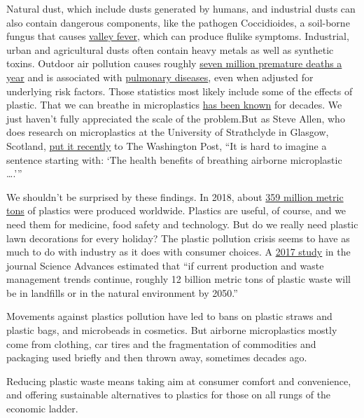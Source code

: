 Natural dust, which include dusts generated by humans, and industrial
dusts can also contain dangerous components, like the pathogen
Coccidioides, a soil-borne fungus that causes
\href{https://www.mayoclinic.org/diseases-conditions/valley-fever/symptoms-causes/syc-20378761}{valley
fever}, which can produce flulike symptoms. Industrial, urban and
agricultural dusts often contain heavy metals as well as synthetic
toxins. Outdoor air pollution causes roughly
\href{https://www.who.int/mediacentre/news/releases/2014/air-pollution/en/}{seven
million premature deaths a year} and is associated with
\href{https://www.nejm.org/doi/full/10.1056/NEJM199312093292401}{pulmonary
diseases}, even when adjusted for underlying risk factors. Those
statistics most likely include some of the effects of plastic. That we
can breathe in microplastics
\href{https://cebp.aacrjournals.org/content/cebp/7/5/419.full.pdf}{has
been known} for decades. We just haven't fully appreciated the scale of
the problem.But as Steve Allen, who does research on microplastics at
the University of Strathclyde in Glasgow, Scotland,
\href{https://www.washingtonpost.com/weather/2020/06/14/national-parks-deep-sea-plastic-pollution-is-showing-up-wherever-scientists-look/}{put
it recently} to The Washington Post, ``It is hard to imagine a sentence
starting with: `The health benefits of breathing airborne microplastic
\ldots{}.'''

We shouldn't be surprised by these findings. In 2018, about
\href{https://www.statista.com/statistics/282732/global-production-of-plastics-since-1950/}{359
million metric tons} of plastics were produced worldwide. Plastics are
useful, of course, and we need them for medicine, food safety and
technology. But do we really need plastic lawn decorations for every
holiday? The plastic pollution crisis seems to have as much to do with
industry as it does with consumer choices. A
\href{https://advances.sciencemag.org/content/3/7/e1700782.full}{2017
study} in the journal Science Advances estimated that ``if current
production and waste management trends continue, roughly 12 billion
metric tons of plastic waste will be in landfills or in the natural
environment by 2050.''

Movements against plastics pollution have led to bans on plastic straws
and plastic bags, and microbeads in cosmetics. But airborne
microplastics mostly come from clothing, car tires and the fragmentation
of commodities and packaging used briefly and then thrown away,
sometimes decades ago.

Reducing plastic waste means taking aim at consumer comfort and
convenience, and offering sustainable alternatives to plastics for those
on all rungs of the economic ladder.

